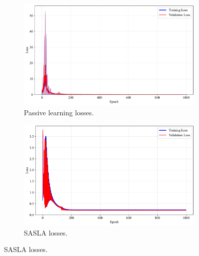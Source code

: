 \documentclass[10pt, conference]{IEEEtran}
\begin{document}
\begin{figure}[!t]
	\centering
	\caption{Losses for training of frameworks with the synthetic function dataset.}
	
	\begin{subfigure}{\linewidth}
		\centering
		\includegraphics[width=\linewidth]{../results/synfunc/losses.pdf}
		\caption{Passive learning losses.}
		\label{fig:losses_synfunc}
	\end{subfigure}
	
	\vspace{0.1em}
	
	\begin{subfigure}{\linewidth}
		\centering
		\includegraphics[width=\linewidth]{../results/synfunc/os_losses.pdf}
		\caption{SASLA losses.}
		\label{fig:os_losses_synfunc}
	\end{subfigure}
	
	\vspace{0.1em}
	

\end{figure}
\end{document}
